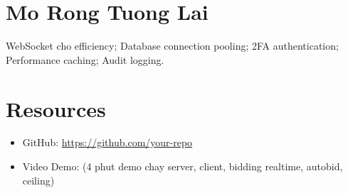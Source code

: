 ﻿\documentclass[12pt, a4paper]{report}
\begin{document}
\section{Mo Rong Tuong Lai}
WebSocket cho efficiency; Database connection pooling; 2FA authentication; Performance caching; Audit logging.

\section{Resources}
\begin{itemize}
    \item GitHub: \url{https://github.com/your-repo}
    \item Video Demo: (4 phut demo chay server, client, bidding realtime, autobid, ceiling)
\end{itemize}
\end{document}
